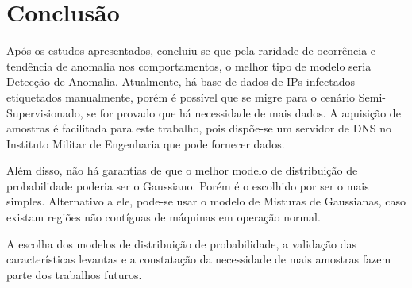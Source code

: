 \chapter{Conclusão}
Após os estudos apresentados, concluiu-se que pela raridade de ocorrência e tendência de anomalia nos comportamentos, o melhor tipo de modelo seria Detecção de Anomalia. Atualmente, há base de dados de IPs infectados etiquetados manualmente, porém é possível que se migre para o cenário Semi-Supervisionado, se for provado que há necessidade de mais dados. A aquisição de amostras é facilitada para este trabalho, pois dispõe-se um servidor de DNS no Instituto Militar de Engenharia que pode fornecer dados.

Além disso, não há garantias de que o melhor modelo de distribuição de probabilidade poderia ser o Gaussiano. Porém é o escolhido por ser o mais simples. Alternativo a ele, pode-se usar o modelo de Misturas de Gaussianas, caso existam regiões não contíguas de máquinas em operação normal.

A escolha dos modelos de distribuição de probabilidade, a validação das características levantas e a constatação da necessidade de mais amostras fazem parte dos trabalhos futuros.

